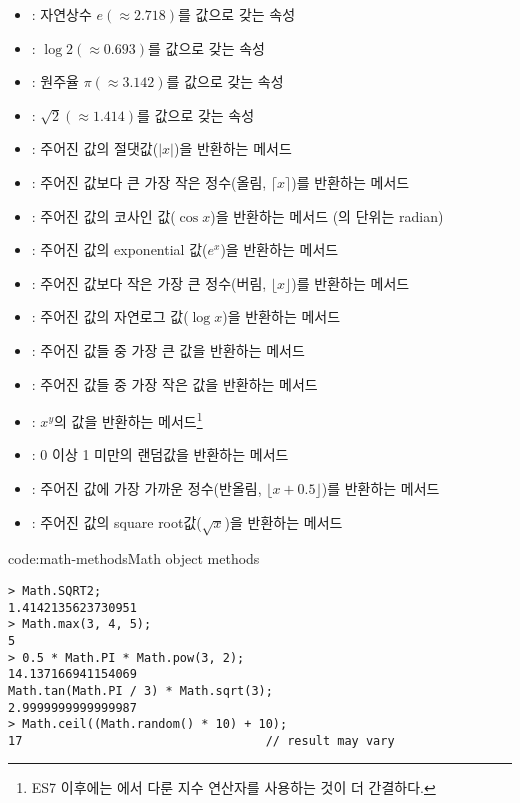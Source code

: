 \begin{itemize}
    \item {}: 자연상수 $e (\approx 2.718)$를 값으로 갖는 속성
    \item {}: $\log 2 (\approx 0.693)$를 값으로 갖는 속성
    \item {}: 원주율 $\pi (\approx 3.142)$를 값으로 갖는 속성
    \item {}: $\sqrt 2 (\approx 1.414)$를 값으로 갖는 속성
    \item {}: 주어진 값의 절댓값($|x|$)을 반환하는 메서드
    \item {}: 주어진 값보다 큰 가장 작은 정수(올림, $\lceil x\rceil$)를 반환하는 메서드
    \item {}: 주어진 값의 코사인 값($\cos x$)을 반환하는 메서드 (의 단위는 radian)
    \item {}: 주어진 값의 exponential 값($e^x$)을 반환하는 메서드
    \item {}: 주어진 값보다 작은 가장 큰 정수(버림, $\lfloor x\rfloor$)를 반환하는 메서드
    \item {}: 주어진 값의 자연로그 값($\log x$)을 반환하는 메서드
    \item {}: 주어진 값들 중 가장 큰 값을 반환하는 메서드
    \item {}: 주어진 값들 중 가장 작은 값을 반환하는 메서드
    \item {}: $x^y$의 값을 반환하는 메서드\footnote{ES7 이후에는 에서 다룬 지수 연산자를 사용하는 것이 더 간결하다.}
    \item {}: 0 이상 1 미만의 랜덤값을 반환하는 메서드
    \item {}: 주어진 값에 가장 가까운 정수(반올림, $\lfloor x + 0.5\rfloor$)를 반환하는 메서드
    \item {}: 주어진 값의 square root값($\sqrt{x}$)을 반환하는 메서드
\end{itemize}

\begin{codeenv}{code:math-methods}{Math object methods}\begin{verbatim}
> Math.SQRT2;
1.4142135623730951
> Math.max(3, 4, 5);
5
> 0.5 * Math.PI * Math.pow(3, 2);
14.137166941154069
Math.tan(Math.PI / 3) * Math.sqrt(3);
2.9999999999999987
> Math.ceil((Math.random() * 10) + 10);
17                                  // result may vary
\end{verbatim}
\end{codeenv}
